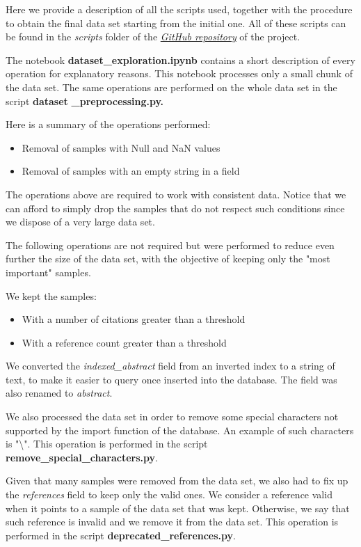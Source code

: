 \documentclass{Configuration_Files/PoliMi3i_thesis}
\begin{document}
Here we provide a description of all the scripts used, together with the procedure to obtain the final data set starting from the initial one. All of these scripts can be found in the \textit{scripts} folder of the \href{https://github.com/albertopirillo/smbud-project-2022}{\textit{GitHub repository}} of the project.

The notebook \textbf{dataset\_exploration.ipynb} contains a short description of every operation for explanatory reasons. This notebook processes only a small chunk of the data set. The same operations are performed on the whole data set in the script \textbf{dataset} \textbf{\_preprocessing.py.}

Here is a summary of the operations performed:
\begin{itemize}
    \item Removal of samples with Null and NaN values
    \item Removal of samples with an empty string in a field
\end{itemize}

The operations above are required to work with consistent data. Notice that we can afford to simply drop the samples that do not respect such conditions since we dispose of a very large data set.

The following operations are not required but were performed to reduce even further the size of the data set, with the objective of keeping only the "most important" samples. 

We kept the samples:
\begin{itemize}
    \item With a number of citations greater than a threshold
    \item With a reference count greater than a threshold
\end{itemize}

We converted the \textit{indexed\_abstract} field from an inverted index to a string of text, to make it easier to query once inserted into the database. The field was also renamed to \textit{abstract}.

We also processed the data set in order to remove some special characters not supported by the import function of the database. An example of such characters is "{\textbackslash}". This operation is performed in the script \textbf{remove\_special\_characters.py}.

Given that many samples were removed from the data set, we also had to fix up the \textit{references} field to keep only the valid ones. We consider a reference valid when it points to a sample of the data set that was kept. Otherwise, we say that such reference is invalid and we remove it from the data set. This operation is performed in the script \textbf{deprecated\_references.py}.
\end{document}
